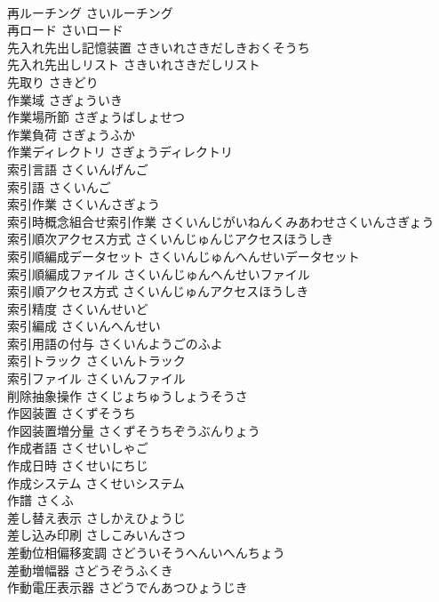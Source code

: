 \documentclass[8pt]{extreport}
\begin{document}
\begin{CJK}{UTF8}{min}
\\	再ルーチング	さいルーチング	
\\	再ロード	さいロード	
\\	先入れ先出し記憶装置	さきいれさきだしきおくそうち	
\\	先入れ先出しリスト	さきいれさきだしリスト	
\\	先取り	さきどり	
\\	作業域	さぎょういき	
\\	作業場所節	さぎょうばしょせつ	
\\	作業負荷	さぎょうふか	
\\	作業ディレクトリ	さぎょうディレクトリ	
\\	索引言語	さくいんげんご	
\\	索引語	さくいんご	
\\	索引作業	さくいんさぎょう	
\\	索引時概念組合せ索引作業	さくいんじがいねんくみあわせさくいんさぎょう	
\\	索引順次アクセス方式	さくいんじゅんじアクセスほうしき	
\\	索引順編成データセット	さくいんじゅんへんせいデータセット	
\\	索引順編成ファイル	さくいんじゅんへんせいファイル	
\\	索引順アクセス方式	さくいんじゅんアクセスほうしき	
\\	索引精度	さくいんせいど	
\\	索引編成	さくいんへんせい	
\\	索引用語の付与	さくいんようごのふよ	
\\	索引トラック	さくいんトラック	
\\	索引ファイル	さくいんファイル	
\\	削除抽象操作	さくじょちゅうしょうそうさ	
\\	作図装置	さくずそうち	
\\	作図装置増分量	さくずそうちぞうぶんりょう	
\\	作成者語	さくせいしゃご	
\\	作成日時	さくせいにちじ	
\\	作成システム	さくせいシステム	
\\	作譜	さくふ	
\\	差し替え表示	さしかえひょうじ	
\\	差し込み印刷	さしこみいんさつ	
\\	差動位相偏移変調	さどういそうへんいへんちょう	
\\	差動増幅器	さどうぞうふくき	
\\	作動電圧表示器	さどうでんあつひょうじき	

\end{CJK}
\end{document}
